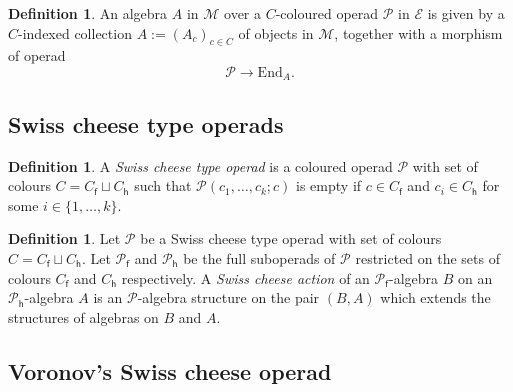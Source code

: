 \documentclass[]{amsart}
\theoremstyle{definition}
\newtheorem{definition}[theorem]{Definition}
\begin{document}
\begin{definition}
	An algebra $A$ in $\mathcal{M}$ over a $C$-coloured operad $\mathcal{P}$ in $\mathcal{E}$ is given by a $C$-indexed collection $A := (A_c)_{c \in C}$ of objects in $\mathcal{M}$, together with a morphism of operad
	\[
		\mathcal{P} \to \mathrm{End}_A.
	\]
\end{definition}


\subsection{Swiss cheese type operads}

\begin{definition}\cite[Definition 2.11]{quesney}
	A \emph{Swiss cheese type operad} is a coloured operad $\mathcal{P}$ with set of colours $C = C_\mathsf{f} \sqcup C_\mathsf{h}$ such that $\mathcal{P}(c_1,\ldots,c_k;c)$ is empty if $c \in C_\mathsf{f}$ and $c_i \in C_\mathsf{h}$ for some $i \in \{1,\ldots,k\}$.
\end{definition}

\begin{definition}\cite[Definition 8]{kontsevich}\label{definitionswisscheeseaction}
	Let $\mathcal{P}$ be a Swiss cheese type operad with set of colours $C = C_\mathsf{f} \sqcup C_\mathsf{h}$. Let $\mathcal{P}_\mathsf{f}$ and $\mathcal{P}_\mathsf{h}$ be the full suboperads of $\mathcal{P}$ restricted on the sets of colours $C_\mathsf{f}$ and $C_\mathsf{h}$ respectively. A \emph{Swiss cheese action} of an $\mathcal{P}_\mathsf{f}$-algebra $B$ on an $\mathcal{P}_\mathsf{h}$-algebra $A$ is an $\mathcal{P}$-algebra structure on the pair $(B,A)$ which extends the structures of algebras on $B$ and $A$.
\end{definition}

\subsection{Voronov's Swiss cheese operad}\label{sectionvoronov}
\end{document}
